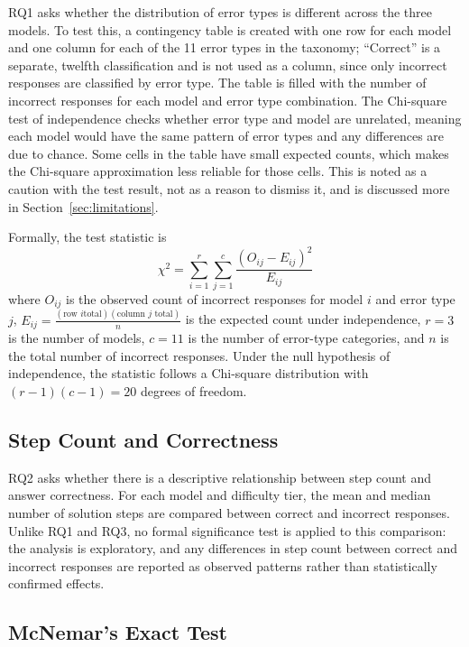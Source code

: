 RQ1 asks whether the distribution of error types is different across the
three models. To test this, a contingency table is created with one row
for each model and one column for each of the 11 error types in the
taxonomy; ``Correct'' is a separate, twelfth classification and is not
used as a column, since only incorrect responses are classified by error
type. The table is filled with the number of incorrect responses for each
model and error type combination. The Chi-square test of independence
checks whether error type and model are unrelated, meaning each model
would have the same pattern of error types and any differences are due to
chance. Some cells in the table have small expected counts, which makes
the Chi-square approximation less reliable for those cells. This is noted
as a caution with the test result, not as a reason to dismiss it, and is
discussed more in Section~\ref{sec:limitations}.

Formally, the test statistic is
\[
\chi^2 = \sum_{i=1}^{r} \sum_{j=1}^{c} \frac{(O_{ij} - E_{ij})^2}{E_{ij}}
\]
where $O_{ij}$ is the observed count of incorrect responses for model
$i$ and error type $j$, $E_{ij} = \frac{(\text{row } i \text{
total})(\text{column } j \text{ total})}{n}$ is the expected count
under independence, $r = 3$ is the number of models, $c = 11$ is the
number of error-type categories, and $n$ is the total number of
incorrect responses. Under the null hypothesis of independence, the
statistic follows a Chi-square distribution with $(r-1)(c-1) = 20$
degrees of freedom.

\subsection{Step Count and Correctness}

RQ2 asks whether there is a descriptive relationship between step count
and answer correctness. For each model and difficulty tier, the mean and
median number of solution steps are compared between correct and
incorrect responses. Unlike RQ1 and RQ3, no formal significance test is
applied to this comparison: the analysis is exploratory, and any
differences in step count between correct and incorrect responses are
reported as observed patterns rather than statistically confirmed
effects.

\subsection{McNemar's Exact Test}

